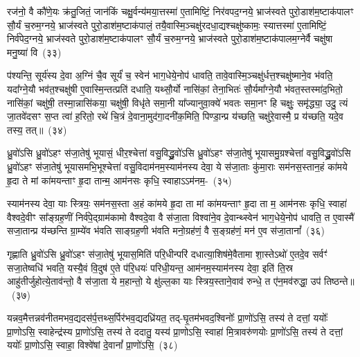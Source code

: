 {\anuvakamend[{इ॒न्द्रि॒यका॑मः सवि॒तुस्तेज॒स्तत्पु॑रो॒डाशो॒\-ऽष्टात्रिꣳ॑शच्च}]}

रज॑नो॒ वै कौ॑णे॒यः क्र॑तु॒जितं॒ जान॑किं चक्षु॒र्वन्य॑मया॒त्तस्मा॑ ए॒तामिष्टिं॒ निर॑वपद॒ग्नये॒ भ्राज॑स्वते पुरो॒डाश॑\-म॒ष्टाक॑पालꣳ सौ॒र्यं च॒रुम॒ग्नये॒ भ्राज॑स्वते पुरो॒डाश॑\-म॒ष्टाक॑पालं॒ तयै॒वास्मि॒ञ्चक्षु॑\-र\-दधा॒द्यश्चक्षु॑ष्कामः॒ स्यात्तस्मा॑ ए॒तामिष्टिं॒ निर्व॑पेद॒ग्नये॒ भ्राज॑स्वते पुरो॒डाश॑\-म॒ष्टाक॑पालꣳ सौ॒र्यं च॒रुम॒ग्नये॒ भ्राज॑स्वते पुरो॒डाश॑\-म॒ष्टाक॑पालम॒ग्नेर्वै चक्षु॑षा मनु॒ष्या॑ वि~(३३)\ip

प॑श्यन्ति॒ सूर्य॑स्य दे॒वा अ॒ग्निं चै॒व सूर्यं॑ च॒ स्वेन॑ भाग॒धेये॒नोप॑ धावति॒ तावे॒वास्मि॒ञ्चक्षु॑र्धत्त॒श्चक्षु॑ष्माने॒व भ॑वति॒ यदा᳚ग्ने॒यौ भव॑त॒श्चक्षु॑षी ए॒वास्मि॒न्तत्प्रति॑ दधाति॒ यथ्सौ॒र्यो नासि॑कां॒ तेना॒भितः॑ सौ॒र्यमा᳚ग्ने॒यौ भ॑वत॒स्तस्मा॑द॒भितो॒ नासि॑कां॒ चक्षु॑षी॒ तस्मा॒न्नासि॑कया॒ चक्षु॑षी॒ विधृ॑ते समा॒नी या᳚ज्यानुवा॒क्ये॑ भवतः समा॒नꣳ हि चक्षुः॒ समृ॑द्ध्या॒ उदु॒ त्यं जा॒तवे॑दसꣳ स॒प्त त्वा॑ ह॒रितो॒ रथे॑ चि॒त्रं दे॒वाना॒मुद॑गा॒दनी॑क॒मिति॒ पिण्डा॒न्प्र य॑च्छति॒ चक्षु॑रे॒वास्मै॒ प्र य॑च्छति॒ यदे॒व तस्य॒ तत्॥~(३४)\ip

{\anuvakamend[{वि ह्य॑ष्टाविꣳ॑शतिश्च}]}

ध्रु॒वो॑\-ऽसि ध्रु॒वो॑\-ऽहꣳ स॑जा॒तेषु॑ भूयासं॒ धीर॒श्चेत्ता॑ वसु॒विद्ध्रु॒वो॑\-ऽसि ध्रु॒वो॑\-ऽहꣳ स॑जा॒तेषु॑ भूयासमु॒ग्रश्चेत्ता॑ वसु॒विद्ध्रु॒वो॑\-ऽसि ध्रु॒वो॑\-ऽहꣳ स॑जा॒तेषु॑ भूयासमभि॒भूश्चेत्ता॑ वसु॒विदाम॑नम॒स्याम॑नस्य देवा॒ ये स॑जा॒ताः कु॑मा॒राः सम॑नस॒स्तान॒हं का॑मये हृ॒दा ते मां का॑मयन्ताꣳ हृ॒दा तान्म॒ आम॑नसः कृधि॒ स्वाहा\-ऽऽ\-म॑नम॒-~(३५)\ip

स्याम॑नस्य देवा॒ याः स्त्रियः॒ सम॑नस॒स्ता अ॒हं का॑मये हृ॒दा ता मां का॑मयन्ताꣳ हृ॒दा ता म॒ आम॑नसः कृधि॒ स्वाहा॑ वैश्वदे॒वीꣳ सा᳚ङ्ग्रह॒णीं निर्व॑पे॒द्ग्राम॑कामो वैश्वदे॒वा वै स॑जा॒ता विश्वा॑ने॒व दे॒वान्थ्स्वेन॑ भाग॒धेये॒नोप॑ धावति॒ त ए॒वास्मै॑ सजा॒तान्प्र य॑च्छन्ति ग्रा॒म्ये॑व भ॑वति साङ्ग्रह॒णी भ॑वति मनो॒ग्रह॑णं॒ वै स॒ङ्ग्रह॑णं॒ मन॑ ए॒व स॑जा॒तानां᳚~(३६)\ip

गृह्णाति ध्रु॒वो॑\-ऽसि ध्रु॒वो॑\-ऽहꣳ स॑जा॒तेषु॑ भूयास॒मिति॑ परि॒धीन्परि॑ दधात्या॒शिष॑मे॒वैतामा शा॒स्ते\-ऽथो॑ ए॒तदे॒व सर्वꣳ॑ सजा॒तेष्वधि॑ भवति॒ यस्यै॒वं वि॒दुष॑ ए॒ते प॑रि॒धयः॑ परिधी॒यन्त॒ आम॑नम॒स्याम॑नस्य देवा॒ इति॑ ति॒स्र आहु॑तीर्जुहोत्ये॒ताव॑न्तो॒ वै स॑जा॒ता ये म॒हान्तो॒ ये क्षु॑ल्ल॒का याः स्त्रिय॒स्ताने॒वाव॑ रुन्धे॒ त ए॑न॒मव॑रुद्धा॒ उप॑ तिष्ठन्ते॥~(३७)\ip

{\anuvakamend[{स्वाहाम॑नमसि सजा॒तानाꣳ॑ रुन्धे॒ पञ्च॑ च}]}

यन्नव॒मैत्तन्नव॑नीतमभव॒द्यदस॑र्प॒त्तथ्स॒र्पिर॑भव॒द्यदध्रि॑यत॒ तद्-घृ॒तम॑\-भव\-द॒श्विनोः᳚ प्रा॒णो॑\-ऽसि॒ तस्य॑ ते दत्तां॒ ययोः᳚ प्रा॒णो\-ऽसि॒ स्वाहेन्द्र॑स्य प्रा॒णो॑\-ऽसि॒ तस्य॑ ते ददातु॒ यस्य॑ प्रा॒णो\-ऽसि॒ स्वाहा॑ मि॒त्रावरु॑णयोः प्रा॒णो॑\-ऽसि॒ तस्य॑ ते दत्तां॒ ययोः᳚ प्रा॒णो\-ऽसि॒ स्वाहा॒ विश्वे॑षां दे॒वानां᳚ प्रा॒णो॑\-ऽसि॒~(३८)\ip

